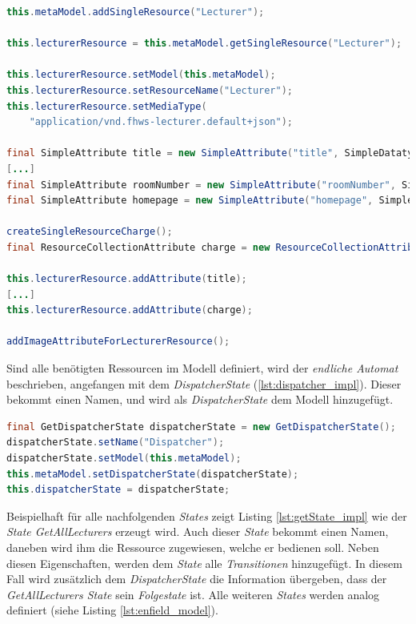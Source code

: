 \begin{lstlisting}[label=lst:lecturer_res,
language=java,
firstnumber=1,
caption=Erzeugung der \textit{SingleResource} \textit{Lecturer}. ]
this.metaModel.addSingleResource("Lecturer");

this.lecturerResource = this.metaModel.getSingleResource("Lecturer");

this.lecturerResource.setModel(this.metaModel);
this.lecturerResource.setResourceName("Lecturer");
this.lecturerResource.setMediaType(
	"application/vnd.fhws-lecturer.default+json");

final SimpleAttribute title = new SimpleAttribute("title", SimpleDatatype.STRING);
[...]
final SimpleAttribute roomNumber = new SimpleAttribute("roomNumber", SimpleDatatype.STRING);
final SimpleAttribute homepage = new SimpleAttribute("homepage", SimpleDatatype.LINK);

createSingleResourceCharge();
final ResourceCollectionAttribute charge = new ResourceCollectionAttribute("chargeUrl", this.chargeResource);

this.lecturerResource.addAttribute(title);
[...]
this.lecturerResource.addAttribute(charge);

addImageAttributeForLecturerResource();
\end{lstlisting}

Sind alle benötigten Ressourcen im Modell definiert, wird der \textit{endliche Automat} beschrieben, angefangen mit dem \textit{DispatcherState} (\ref{lst:dispatcher_impl}). Dieser bekommt einen Namen, und wird als \textit{DispatcherState} dem Modell hinzugefügt.

\begin{lstlisting}[label=lst:dispatcher_impl,
language=java,
firstnumber=1,
caption=Erzeugung des \textit{DispatcherStates}. ]
final GetDispatcherState dispatcherState = new GetDispatcherState();
dispatcherState.setName("Dispatcher");
dispatcherState.setModel(this.metaModel);
this.metaModel.setDispatcherState(dispatcherState);
this.dispatcherState = dispatcherState;
\end{lstlisting}

\newpage

Beispielhaft für alle nachfolgenden \textit{States} zeigt Listing \ref{lst:getState_impl} wie der \textit{State GetAllLecturers} erzeugt wird.
Auch dieser \textit{State} bekommt einen Namen, daneben wird ihm die Ressource zugewiesen, welche er bedienen soll. Neben diesen Eigenschaften, werden dem \textit{State} alle \textit{Transitionen} hinzugefügt. In diesem Fall wird zusätzlich dem \textit{DispatcherState} die Information übergeben, dass der \textit{GetAllLecturers State} sein \textit{Folgestate} ist. Alle weiteren \textit{States} werden analog definiert (siehe Listing \ref{lst:enfield_model}).

